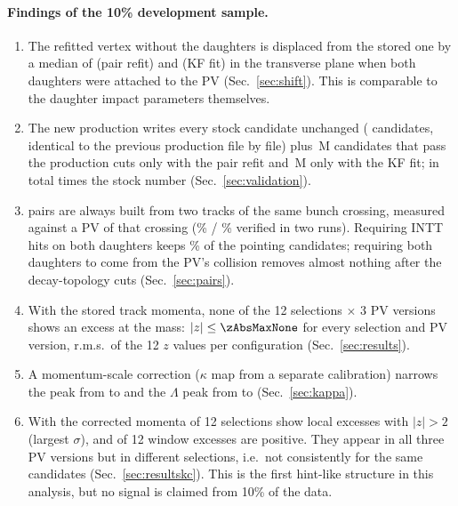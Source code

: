 \paragraph{Findings of the 10\% development sample.}
\begin{enumerate}
\item The refitted vertex without the daughters is displaced from the stored one by a median of \shPairTwoMed\um{}
  (pair refit) and \shKfTwoMed\um{} (KF fit) in the transverse plane when both daughters were attached to the PV
  (Sec.~\ref{sec:shift}). This is comparable to the daughter impact parameters themselves.
\item The new production writes every stock candidate unchanged (\repNoneExact{} candidates, identical to the previous
  production file by file) plus \repOnlyR\,M candidates that pass the production cuts only with the pair refit and
  \repOnlyK\,M only with the KF fit; in total \repRatio{} times the stock number (Sec.~\ref{sec:validation}).
\item \Dzero{} pairs are always built from two tracks of the same bunch crossing, measured against a PV of that crossing
  (\pcSameA\% / \pcSameB\% verified in two runs). Requiring INTT hits on both daughters keeps \cutPtAllIntt\% of the
  pointing candidates; requiring both daughters to come from the PV's collision removes almost nothing after the
  decay-topology cuts (Sec.~\ref{sec:pairs}).
\item With the stored track momenta, none of the 12 selections $\times$ 3 PV versions shows an excess at the \Dzero{}
  mass: $|z|\leq\zAbsMaxNone$ for every selection and PV version, r.m.s.\ of the 12 $z$ values per configuration
  \zRmsNone{} (Sec.~\ref{sec:results}).
\item A momentum-scale correction ($\kappa$ map from a separate calibration) narrows the \Ks{} peak from \vKsAllSigRc{}
  to \vKsAllSigKc\mev{} and the $\Lambda$ peak from \vLaAllSigRc{} to \vLaAllSigKc\mev{} (Sec.~\ref{sec:kappa}).
\item With the corrected momenta \zGtTwoKcNone{} of 12 selections show local excesses with $|z|>2$ (largest
  \zAbsMaxKcNone$\sigma$), and \zPosKcNone{} of 12 window excesses are positive. They appear in all three PV versions but in
  different selections, i.e.\ not consistently for the same candidates (Sec.~\ref{sec:resultskc}). This is the first hint-like
  structure in this analysis, but no signal is claimed from 10\% of the data.
\end{enumerate}

